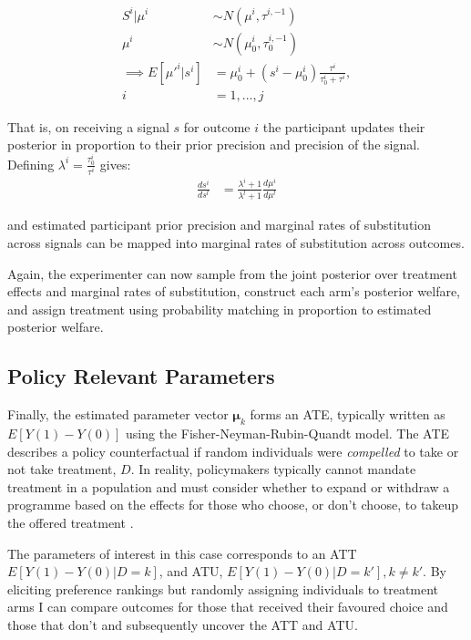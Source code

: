 \documentclass[twoside,11pt]{article}
\begin{document}
\begin{align*}
    S^i  | \mu^i  &\sim N\left(\mu^i, \tau^{i,-1}\right) \\
    \mu^i &\sim N\left(\mu^i_0, \tau_0^{i,-1}\right) \\
    \implies E[\mu'^{i} | s^{i} ]   &= \mu^i_0 + (s^i - \mu^i_0) \frac{\tau^i}{\tau^i_0 + \tau^i}, 
    \\ i &= 1, ..., j 
\end{align*}
   
That is, on receiving a signal $s$ for outcome $i$ the participant updates their
 posterior in proportion to their prior precision and precision of the signal. 
 Defining $\lambda^i = \frac{\tau^i_0}{\tau^i}$ gives:
 \begin{align*}
   \frac{ds^i}{ds^l} &= \frac{\lambda^i + 1}{\lambda^l + 1} \frac{d\mu^i}{d\mu^l}
 \end{align*}

and estimated participant prior precision and marginal rates of substitution 
across signals can be mapped into marginal rates of substitution across outcomes.


Again, the experimenter can now sample from 
the joint posterior over treatment effects and marginal rates of substitution, 
construct each arm's posterior welfare, and assign treatment using probability 
matching in proportion to estimated posterior welfare.

\subsection{Policy Relevant Parameters}

Finally, the estimated parameter vector $\bm{\mu}_k$ forms an ATE, typically 
written as $E[Y(1) - Y(0)]$ using the Fisher-Neyman-Rubin-Quandt model. The 
ATE describes a policy counterfactual if random individuals were \textit{compelled}
to take or not take treatment, $D$. In reality, policymakers typically cannot 
mandate treatment in a population and must consider whether to expand or 
withdraw a programme based on the effects for those who choose, or don't choose, 
to takeup the offered treatment \citep{heckman-1,heckman-2}.

The parameters of interest in this case corresponds to an ATT $E[Y(1) - Y(0) | D = k]$, 
and ATU, $E[Y(1) - Y(0) | D = k'], k \neq k'$. By eliciting preference rankings 
but randomly assigning individuals to treatment arms I can compare outcomes 
for those that received their favoured choice and those that don't and subsequently 
uncover the ATT and ATU.
\end{document}
